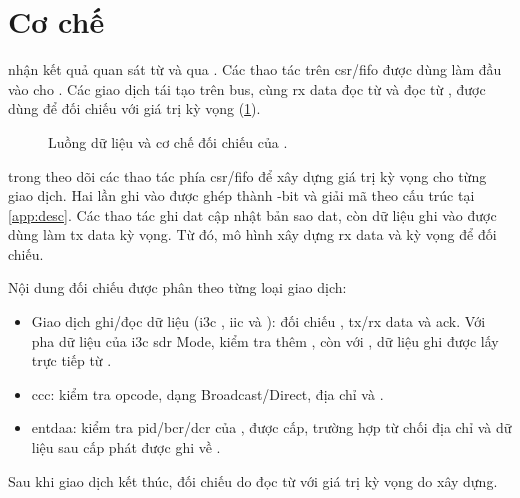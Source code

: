 \section{Cơ chế \Scoreboard{}}
\label{sec:ver-tlm}

\Scoreboard{} nhận kết quả quan sát từ \RegisterMonitor{} và \IThreeCMonitor{} qua
\TLMAnalysisPort{}. Các thao tác trên \gls{csr}/\gls{fifo} được dùng làm đầu vào cho
\ReferenceModel{}. Các giao dịch tái tạo trên bus, cùng \gls{rx} data đọc từ \RxFifo{} và
\ResponseDescriptor{} đọc từ \ResponseFifo{}, được dùng để đối chiếu với giá trị kỳ vọng
(\cref{fig:sb-flow}).

\begin{figure}[!htbp]
	\centering
	
	\caption{Luồng dữ liệu và cơ chế đối chiếu của \Scoreboard{}.}
	\label{fig:sb-flow}
\end{figure}

\ReferenceModel{} trong \Scoreboard{} theo dõi các thao tác phía \gls{csr}/\gls{fifo} để xây dựng
giá trị kỳ vọng cho từng giao dịch. Hai lần ghi vào \CommandFifo{} được ghép thành
\CommandDescriptor{} \CommandDescriptorWidth{}-bit và giải mã theo cấu trúc tại
\cref{app:desc}. Các thao tác ghi \gls{dat} cập nhật bản sao \gls{dat}, còn dữ liệu ghi vào
\TxFifo{} được dùng làm \gls{tx} data kỳ vọng. Từ đó, mô hình xây dựng \gls{rx} data và
\ResponseDescriptor{} kỳ vọng để \Scoreboard{} đối chiếu.

Nội dung đối chiếu được phân theo từng loại giao dịch:
\begin{itemize}
	\item Giao dịch ghi/đọc dữ liệu (\gls{i3c} \PrivateTransfer{}, \gls{iic} và
	      \ImmediateDataTransfer{}): đối chiếu \AddressHeader{}, \gls{tx}/\gls{rx} data và
	      \gls{ack}. Với pha dữ liệu \PushPull{} của \gls{i3c} \gls{sdr} Mode, kiểm tra thêm \TBit{}, còn với
	      \ImmediateDataTransfer{}, dữ liệu ghi được lấy trực tiếp từ \CommandDescriptor{}.
	\item \gls{ccc}: kiểm tra opcode, dạng Broadcast/Direct, địa chỉ \Target{} và
	      \EventsByte{}.
	\item \gls{entdaa}: kiểm tra \gls{pid}/\gls{bcr}/\gls{dcr} của \Target{}, \DynamicAddress{} được
	      cấp, trường hợp \Target{} từ chối địa chỉ và dữ liệu sau cấp phát được ghi về \RxFifo{}.
\end{itemize}
Sau khi giao dịch kết thúc, \Scoreboard{} đối chiếu \ResponseDescriptor{} do \Host{} đọc từ
\ResponseFifo{} với giá trị kỳ vọng do \ReferenceModel{} xây dựng.

